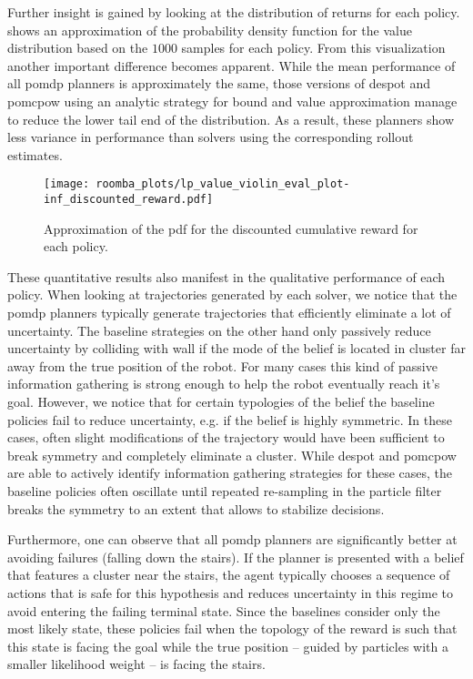 Further insight is gained by looking at the distribution of returns for each
policy.  shows an approximation of the
probability density function for the value distribution based on the $1000$
samples for each policy. From this visualization another important difference
becomes apparent. While the mean performance of all \ac{pomdp} planners is
approximately the same, those versions of \ac{despot} and \ac{pomcpow} using an
analytic strategy for bound and value approximation manage to reduce the lower
tail end of the distribution. As a result, these planners show less variance in
performance than solvers using the corresponding rollout estimates.

\begin{figure}[H]
  \centering
  \texttt{[image: roomba\_plots/lp\_value\_violin\_eval\_plot-inf\_discounted\_reward.pdf]}
  \caption{Approximation of the \acf{pdf} for the discounted cumulative reward
  for each policy.}
  \label{fig:lp-value-violin-inf-discounted}
\end{figure}

These quantitative results also manifest in the qualitative performance of each
policy. When looking at trajectories generated by each solver, we notice that
the \ac{pomdp} planners typically generate trajectories that efficiently
eliminate a lot of uncertainty. The baseline strategies on the other hand only
passively reduce uncertainty by colliding with wall if the mode of the belief
is located in cluster far away from the true position of the robot. For many
cases this kind of passive information gathering is strong enough to help the
robot eventually reach it's goal. However, we notice that for certain
typologies of the belief the baseline policies fail to reduce uncertainty, e.g.
if the belief is highly symmetric. In these cases, often slight modifications
of the trajectory would have been sufficient to break symmetry and completely
eliminate a cluster. While \ac{despot} and \ac{pomcpow} are able to actively
identify information gathering strategies for these cases, the baseline
policies often oscillate until repeated re-sampling in the particle filter
breaks the symmetry to an extent that allows to stabilize decisions.

Furthermore, one can observe that all \ac{pomdp} planners are significantly
better at avoiding failures (falling down the stairs). If the planner is
presented with a belief that features a cluster near the stairs, the agent
typically chooses a sequence of actions that is safe for this hypothesis and
reduces uncertainty in this regime to avoid entering the failing terminal
state. Since the baselines consider only the most likely state, these policies
fail when the topology of the reward is such that this state is facing
the goal while the true position -- guided by particles with a smaller
likelihood weight -- is facing the stairs.

